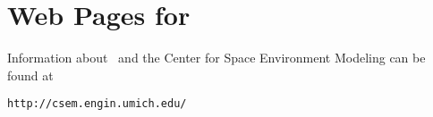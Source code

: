 \section{Web Pages for \BATSRUS}
Information about \BATSRUS\ and the Center for Space Environment Modeling
can be found at
\begin{verbatim}
http://csem.engin.umich.edu/
\end{verbatim}
